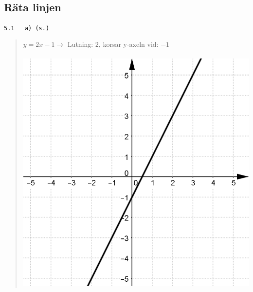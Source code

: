 \documentclass[a4paper]{article}
\newcommand{\tskcol}[1]{\textcolor{tskcol}{#1}}
\begin{document}
	\subsection*{Räta linjen}
	
	\texttt{\tskcol{5.1~~~a) (s.)}}
	\begin{quotation}
		\noindent
		$y=2x-1 \rightarrow$ Lutning: $2$, korsar y-axeln vid: $-1$ \\ \\
		\includegraphics[scale=0.2]{images/51a.png}
	\end{quotation}
	
\end{document}
